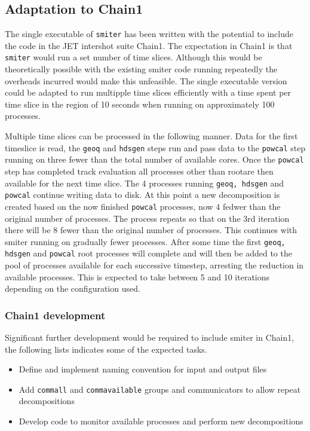 \subsection{Adaptation to Chain1}
The single executable of {\tt smiter} has been written with the potential to include the code in the JET intershot suite Chain1. The expectation in Chain1 is that {\tt smiter} would run a set number of time slices. Although this would be theoretically possible with the existing smiter code running repeatedly the overheads incurred would make this unfeasible. The single executable version could be adapted to run multipple time slices efficiently with a time spent per time slice in the region of 10 seconds when running on approximately 100 processes.

Multiple time slices can be processed in the following manner. Data for the first timeslice is read, the {\tt geoq} and {\tt hdsgen} steps run and pass data to the {\tt powcal} step running on three fewer than the total number of available cores. Once the {\tt powcal} step has completed track evaluation all processes other than rootare then available for the next time slice. The 4 processes running {\tt geoq, hdsgen} and {\tt powcal} continue writing data to disk. At this point a new decomposition is created based on the now finished {\tt powcal} processes, now 4 fedwer than the original number of processes. The process repeats so that on the 3rd iteration there will be 8 fewer than the original number of processes. This continues with smiter running on gradually fewer processes. After some time the first {\tt geoq, hdsgen} and {\tt powcal} root processes will complete and will then be added to the pool of processes available for each successive timestep, arresting the reduction in available processes. This is expected to take between 5 and 10 iterations depending on the configuration used.

\subsubsection{Chain1 development}
Significant further development would be required to include smiter in Chain1, the following lists indicates some of the expected tasks.

\begin{itemize}
\item Define and implement naming convention for input and output files
\item Add {\tt commall} and {\tt commavailable} groups and communicators to allow repeat decompositions
\item Develop code to monitor available processes and perform new decompositions
\end{itemize}

